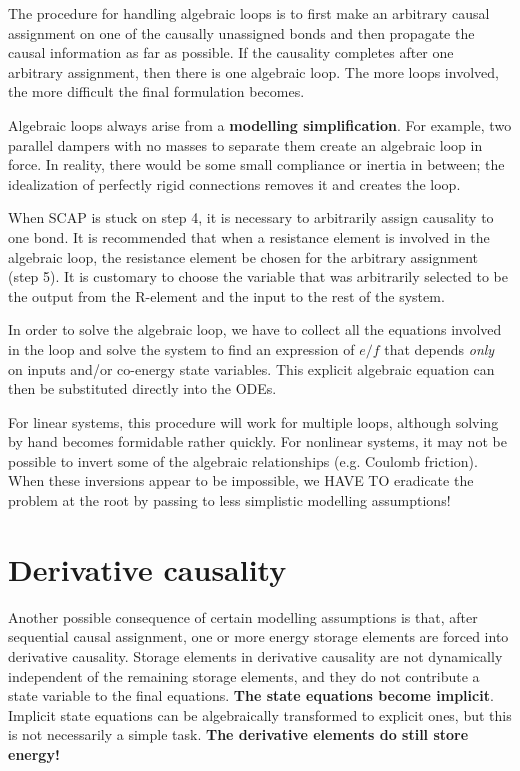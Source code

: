 The procedure for handling algebraic loops is to first make an arbitrary causal assignment on one of the causally unassigned bonds and then propagate the causal information as far as possible. If the causality completes after one arbitrary assignment, then there is one algebraic loop. The more loops involved, the more difficult the final formulation becomes.

\begin{warningbox}
Algebraic loops always arise from a \textbf{modelling simplification}. For example, two parallel dampers with no masses to separate them create an algebraic loop in force. In reality, there would be some small compliance or inertia in between; the idealization of perfectly rigid connections removes it and creates the loop. 
\end{warningbox}

When SCAP is stuck on step 4, it is necessary to arbitrarily assign causality to one bond. It is recommended that when a resistance element is involved in the algebraic loop, the resistance element be chosen for the arbitrary assignment (step 5). It is customary to choose the variable that was arbitrarily selected to be the output from the R-element and the input to the rest of the system. 

In order to solve the algebraic loop, we have to collect all the equations involved in the loop and solve the system to find an expression of $e/f$ that depends \emph{only} on inputs and/or co-energy state variables. This explicit algebraic equation can then be substituted directly into the ODEs.

For linear systems, this procedure will work for multiple loops, although solving by hand becomes formidable rather quickly. For nonlinear systems, it may not be possible to invert some of the algebraic relationships (e.g. Coulomb friction). When these inversions appear to be impossible, we HAVE TO eradicate the problem at the root by passing to less simplistic modelling assumptions!

\section{Derivative causality}

Another possible consequence of certain modelling assumptions is that, after sequential causal assignment, one or more energy storage elements are forced into derivative causality. 
Storage elements in derivative causality are not dynamically independent of the remaining storage elements, and they do not contribute a state variable to the final equations. \textbf{The state equations become implicit}.
Implicit state equations can be algebraically transformed to explicit ones, but this is not necessarily a simple task.
\textbf{The derivative elements do still store energy!}





